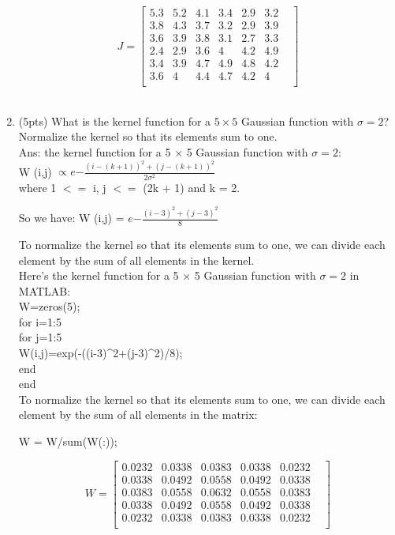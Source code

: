 \documentclass[12pt]{article}
\begin{document}
\begin{enumerate}
$$ J=\begin{bmatrix}	5.3&     5.2&     4.1&     3.4&     2.9&    3.2&\\
						3.8&     4.3&     3.7&     3.2&     2.9&    3.9&\\
					    3.6&     3.9&     3.8&     3.1&     2.7&    3.3&\\
						2.4&     2.9&     3.6&     4&       4.2&    4.9&\\
						3.4&     3.9&     4.7&     4.9&     4.8&    4.2&\\
						3.6&     4&       4.4&     4.7&     4.2&    4&\\
\end{bmatrix}$$\\

\item (5pts) What is the kernel function for a $5\times5$ Gaussian function with $\sigma=2$?   Normalize the kernel so that its elements sum to one. \\
Ans: the kernel function for a 5 × 5 Gaussian function with $\sigma = 2$:\\

W (i,j) $\propto e{-\frac{(i-(k+1))^2 + (j-(k+1))^2}{2\sigma^2}}$ \\

where 1 $<=$ i, j $<=$ (2k + 1) and k = 2.

So we have: W (i,j) = $e{-\frac{(i-3)^2 + (j-3)^2}{8}}$

To normalize the kernel so that its elements sum to one, we can divide each element by the sum of all elements in the kernel.\\

Here’s the kernel function for a 5 × 5 Gaussian function with $\sigma=2$ in MATLAB:\\
W=zeros(5); \\
for i=1:5 \\
    for j=1:5 \\
        W(i,j)=exp(-((i-3)\^{}2+(j-3)\^{}2)/8); \\
    end \\
end \\

To normalize the kernel so that its elements sum to one, we can divide each element by the sum of all elements in the matrix:

W = W/sum(W(:));

$$ W=\begin{bmatrix}	0.0232&     0.0338&     0.0383&    0.0338&  0.0232&\\
						0.0338&     0.0492&     0.0558&    0.0492&  0.0338&\\
					    0.0383&     0.0558&     0.0632&    0.0558&  0.0383&\\
						0.0338&     0.0492&     0.0558&    0.0492&  0.0338&\\
						0.0232&     0.0338&     0.0383&    0.0338&  0.0232&\\
\end{bmatrix}$$\\



\end{enumerate}
\end{document}
